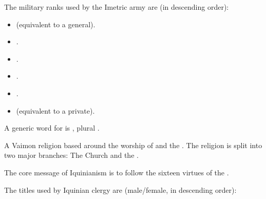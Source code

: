 \begin{gloss}
\begin{subgloss}
  
  
  \begin{comment}
  \subparagraph{Military ranks}
  \end{comment}
  The military ranks used by the Imetric army are (in descending order): 
  
  \begin{itemize}
    \item \Deccor{} (equivalent to a general). 
    \item \Retaxis{}. 
    \item \Salican{}. 
    \item \Vexstra{}. 
    \item \Corphin{}. 
    \item \Inclan{} (equivalent to a private). 
  \end{itemize}

  A generic word for  is \Rengos, plural \Rengoi. 
\end{subgloss}






\begin{comment}
\paragraph{\Iquinian Church}
\end{comment}
A Vaimon religion based around the worship of  and the . 
The religion is split into two major branches: 
The  Church and the . 

The core message of Iquinianism is to follow the sixteen virtues of the \sephiroth.






\begin{subgloss}
  \begin{comment}
  \subparagraph{Clerical ranks}
  \end{comment}
  The titles used by Iquinian clergy are (male/female, in descending order): 
  

\end{subgloss}
\end{gloss}
